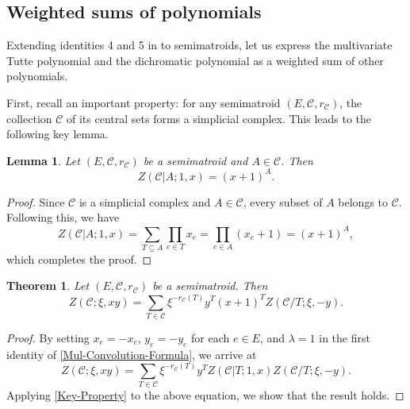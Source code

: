 \documentclass[12pt]{article}%
\renewcommand*{\bm}[1]{#1}%
\numberwithin{equation}{section}
\newtheorem{theorem}{Theorem}[section]
\newtheorem{lemma}[lemma]{Lemma}
\begin{document}
\subsection{Weighted sums of polynomials}\label{Sec-2-3}
Extending identities 4 and 5 in \cite{Kung2010} to semimatroids, let us express the multivariate Tutte polynomial and the dichromatic polynomial as a weighted sum of other polynomials. 

First, recall an important property: for any semimatroid $(E,\mathcal{C},r_{\mathcal{C}})$,  the collection $\mathcal{C}$ of its central sets forms a simplicial complex. This leads to the following key lemma.
\begin{lemma}\label{Key-Property}
Let $(E,\mathcal{C},r_{\mathcal{C}})$ be a semimatroid and $A\in\mathcal{C}$. Then
\[
Z(\mathcal{C}|A;1,\bm x)=(\bm x+1)^A.
\]
\end{lemma}
\begin{proof}
Since $\mathcal{C}$ is a simplicial complex and $A\in\mathcal{C}$, every subset of $A$ belongs to $\mathcal{C}$. Following this, we have
\[
Z(\mathcal{C}|A;1,\bm x)=\sum_{T\subseteq A}\prod_{e\in T}x_e=\prod_{e\in A}(x_e+1)=(\bm x+1)^A,
\]
which completes the proof.
\end{proof}

\begin{theorem}\label{Weighted-Polynomial}
Let $(E,\mathcal{C},r_{\mathcal{C}})$ be a semimatroid. Then
\[
Z(\mathcal{C};\xi,\bm x\bm y)=\sum_{T\in\mathcal{C}}\xi^{-r_\mathcal{C}(T)}\bm y^T(\bm x+1)^TZ(\mathcal{C}/T;\xi,-\bm y).
\]
\end{theorem}
\begin{proof}
By setting $x_e=-x_e$, $y_e=-y_e$ for each $e\in E$, and $\lambda=1$ in the first identity of \autoref{Mul-Convolution-Formula}, we arrive at
\[
Z(\mathcal{C};\xi,\bm x\bm y)=\sum_{T\in\mathcal{C}}\xi^{-r_\mathcal{C}(T)}\bm y^TZ(\mathcal{C}|T;1,\bm x)Z(\mathcal{C}/T;\xi,-\bm y).
\]
Applying \autoref{Key-Property} to the above equation, we show that the result holds.
\end{proof}
\end{document}
